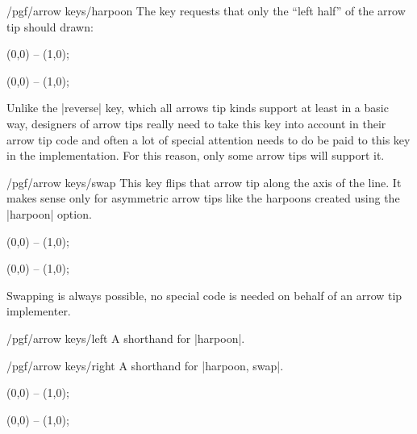 \begin{key}{/pgf/arrow keys/harpoon}
  The key requests that only the ``left half'' of the arrow tip should
  drawn:
\begin{codeexample}[width=3cm]
 \draw [arrows = {-Stealth[harpoon]}] (0,0) -- (1,0);
\end{codeexample}
\begin{codeexample}[width=3cm]
 \draw [arrows = {->[harpoon]}] (0,0) -- (1,0);
\end{codeexample}
  Unlike the |reverse| key, which all arrows tip kinds support at
  least in a basic way, designers of arrow tips really need to take
  this key into account in their arrow tip code and often a lot of
  special attention needs to do be paid to this key in the
  implementation. For this reason, only some arrow tips will support
  it. 
\end{key}

\begin{key}{/pgf/arrow keys/swap}
  This key flips that arrow tip along the axis of the line. It makes
  sense only for asymmetric arrow tips like the harpoons created using
  the |harpoon| option. 
\begin{codeexample}[width=3cm]
 \draw [arrows = {-Stealth[harpoon]}] (0,0) -- (1,0);
\end{codeexample}
\begin{codeexample}[width=3cm]
 \draw [arrows = {-Stealth[harpoon,swap]}] (0,0) -- (1,0);
\end{codeexample}
  Swapping is always possible, no special code is needed on behalf of
  an arrow tip implementer. 
\end{key}

\begin{key}{/pgf/arrow keys/left}
  A shorthand for |harpoon|.  
\end{key}

\begin{key}{/pgf/arrow keys/right}
  A shorthand for |harpoon, swap|.
\begin{codeexample}[width=3cm]
 \draw [arrows = {-Stealth[left]}] (0,0) -- (1,0);
\end{codeexample}
\begin{codeexample}[width=3cm]
 \draw [arrows = {-Stealth[right]}] (0,0) -- (1,0);
\end{codeexample}
\end{key}


